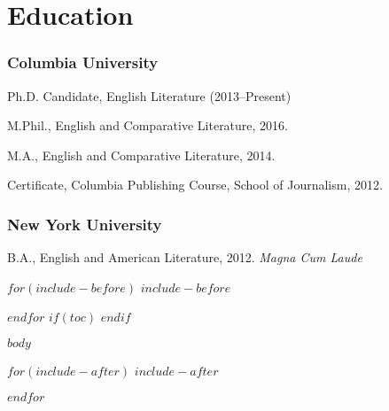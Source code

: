 \documentclass[11pt]{article}
\begin{document}
\bigskip\bigskip\medskip
{}
\reversemarginpar
\bigskip 

\section*{Education}

\subsubsection{Columbia University}

Ph.D. Candidate, English Literature (2013–Present)

\smallskip

M.Phil., English and Comparative Literature, 2016.

\smallskip

M.A., English and Comparative Literature, 2014.

\smallskip

Certificate, Columbia Publishing Course, School of Journalism, 2012.

\medskip

\subsubsection{New York University}

B.A., English and American Literature, 2012. \emph{Magna Cum Laude} %

\medskip

$for(include-before)$
$include-before$

$endfor$
$if(toc)$
\tableofcontents
$endif$

$body$

$for(include-after)$
$include-after$

$endfor$
\end{document}
